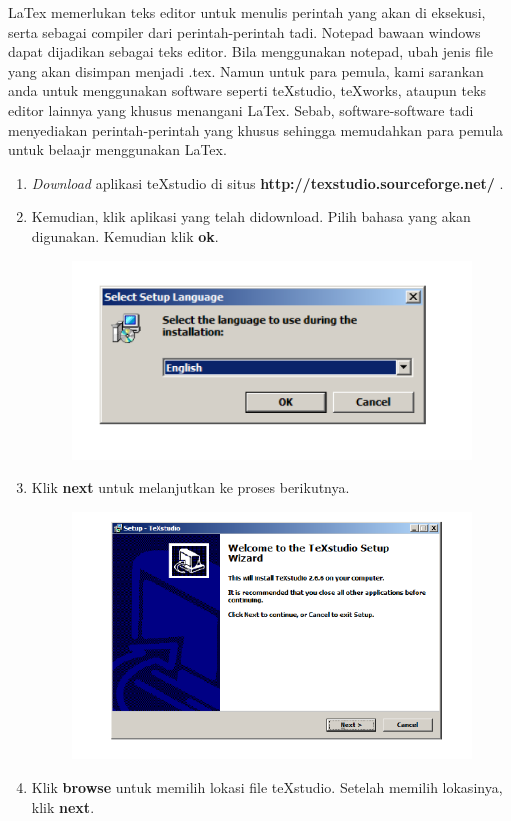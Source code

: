 LaTex memerlukan teks editor untuk menulis perintah yang akan di eksekusi, serta sebagai compiler dari perintah-perintah tadi. Notepad bawaan windows dapat dijadikan sebagai teks editor. Bila menggunakan notepad, ubah jenis file yang akan disimpan menjadi .tex. Namun untuk para pemula, kami sarankan anda untuk menggunakan software seperti teXstudio, teXworks, ataupun teks editor lainnya yang khusus menangani LaTex. Sebab, software-software tadi menyediakan perintah-perintah yang khusus sehingga memudahkan para pemula untuk belaajr menggunakan LaTex.
\begin{enumerate}
\item {\itshape Download} aplikasi teXstudio di situs {\bf http://texstudio.sourceforge.net/} .
\item Kemudian, klik aplikasi yang telah didownload. Pilih bahasa yang akan digunakan. Kemudian klik {\bf ok}.
\begin{figure}[h!]
\centering
\includegraphics[width =10 cm]{img/23.png}
\end{figure}
\newpage
\item Klik {\bf next} untuk melanjutkan ke proses berikutnya.
\begin{figure}[h!]
\centering
\includegraphics[width =10 cm]{img/24.png}
\end{figure}
\item Klik {\bf browse} untuk memilih lokasi file teXstudio. Setelah memilih lokasinya, klik {\bf next}.

\end{enumerate}
